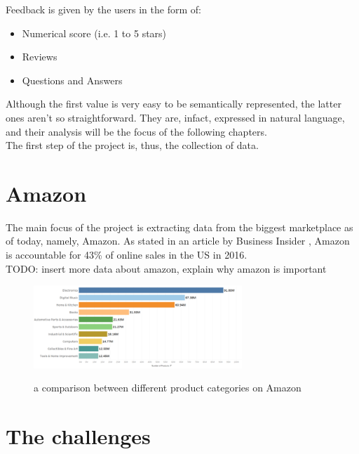 \documentclass[LaM,binding=0.6cm]{sapthesis}
\begin{document}
Feedback is given by the users in the form of:
\begin{itemize}
	\item Numerical score (i.e. 1 to 5 stars)
	\item Reviews
	\item Questions and Answers
\end{itemize}

Although the first value is very easy to be semantically represented, the latter ones aren't so straightforward. They are, infact, expressed in natural language, and their analysis will be the focus of the following chapters. \\

The first step of the project is, thus, the collection of data. 

\section{Amazon}

The main focus of the project is extracting data from the biggest marketplace as of today, namely, Amazon. As stated in an article by Business Insider \cite{intelligence_amazon_nodate}, Amazon is accountable for 43\% of online sales in the US in 2016. \\

TODO: insert more data about amazon, explain why amazon is important

\begin{figure}
\centering
\includegraphics[width=0.7\textwidth]{pictures/prod_types.png}\\[3ex]
\caption{a comparison between different product categories on Amazon}
\label{fig:prod-types}
\end{figure}

\section{The challenges}
\end{document}
